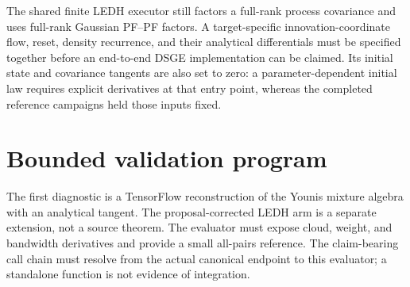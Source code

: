\documentclass[11pt]{article}
\begin{document}
The shared finite
LEDH executor still factors a full-rank process covariance and uses full-rank
Gaussian PF--PF factors.  A target-specific innovation-coordinate flow,
reset, density recurrence, and their analytical differentials must be
specified together before an end-to-end DSGE implementation can be claimed.
Its initial state and covariance tangents are also set to zero: a
parameter-dependent initial law requires explicit derivatives at that entry
point, whereas the completed reference campaigns held those inputs fixed.

\section{Bounded validation program}

The first diagnostic is a TensorFlow reconstruction of the Younis mixture
algebra with an analytical tangent.  The proposal-corrected LEDH arm is a
separate extension, not a source theorem.  The evaluator must expose cloud,
weight, and bandwidth derivatives and provide a small all-pairs reference.  The
claim-bearing call chain must resolve from the actual canonical endpoint to
this evaluator; a standalone function is not evidence of integration.
\end{document}
